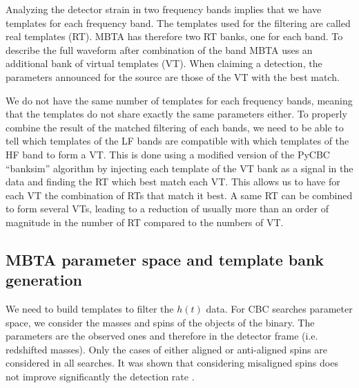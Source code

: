 Analyzing the detector strain in two frequency bands implies that we have templates for each frequency band.
The templates used for the filtering are called real templates (RT).
MBTA has therefore two RT banks, one for each band.
To describe the full waveform after combination of the band MBTA uses an additional bank of virtual templates (VT).
When claiming a detection, the parameters announced for the source are those of the VT with the best match.

We do not have the same number of templates for each frequency bands, meaning that the templates do not share exactly the same parameters either.
To properly combine the result of the matched filtering of each bands, we need to be able to tell which templates of the LF bands are compatible with which templates of the HF band to form a VT.
This is done using a modified version of the PyCBC ``banksim'' algorithm \cite{banksim} by injecting each template of the VT bank as a signal in the data and finding the RT which best match each VT.
This allows us to have for each VT the combination of RTs that match it best.
A same RT can be combined to form several VTs, leading to a reduction of usually more than an order of magnitude in the number of RT compared to the numbers of VT.




\subsection{MBTA parameter space and template bank generation}
\label{sec:param_space}

We need to build templates to filter the $h(t)$ data.
For CBC searches parameter space, we consider the masses and spins of the objects of the binary.
The parameters are the observed ones and therefore in the detector frame (i.e. redshifted masses).
Only the cases of either aligned or anti-aligned spins are considered in all searches.
It was shown that considering misaligned spins does not improve significantly the detection rate \cite{gw150914,bank_spin}.

